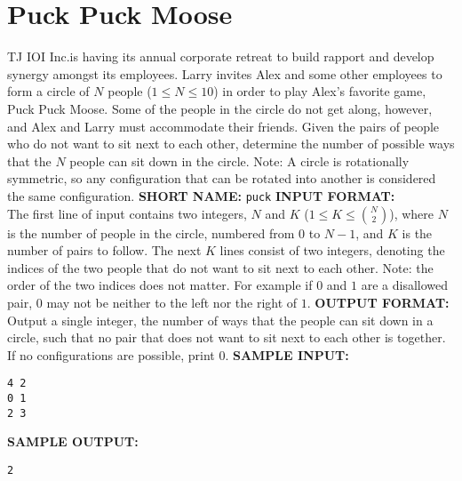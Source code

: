 \section{Puck Puck Moose}

TJ IOI Inc.\@ is having its annual corporate retreat to build rapport and develop synergy amongst its employees. Larry invites Alex and some other employees to form a circle of $ N $ people ($ 1 \leq N \leq 10 $) in order to play Alex's favorite game, Puck Puck Moose.  Some of the people in the circle do not get along, however, and Alex and Larry must accommodate their friends.  Given the pairs of people who do not want to sit next to each other, determine the number of possible ways that the $ N $ people can sit down in the circle.
\blank
Note: A circle is rotationally symmetric, so any configuration that can be rotated into another is considered the same configuration.
\blank
\textbf{SHORT NAME:} \verb|puck|
\blank
\textbf{INPUT FORMAT:}\\
The first line of input contains two integers, $ N $ and $ K $ ($ 1 \leq K \leq {{N}\choose{2}} $), where $ N $ is the number of people in the circle, numbered from $ 0 $ to $ N - 1 $, and $ K $ is the number of pairs to follow. The next $ K $ lines consist of two integers, denoting the indices of the two people that do not want to sit next to each other.
\blank
Note: the order of the two indices does not matter. For example if $ 0 $ and $ 1 $ are a disallowed pair, $ 0 $ may not be neither to the left nor the right of $ 1 $.
\blank
\textbf{OUTPUT FORMAT:}\\
Output a single integer, the number of ways that the people can sit down in a circle, such that no pair that does not want to sit next to each other is together.  If no configurations are possible, print $ 0 $.
\blank
\textbf{SAMPLE INPUT:}
\begin{verbatim}
4 2
0 1
2 3
\end{verbatim}
\textbf{SAMPLE OUTPUT:}
\begin{verbatim}
2
\end{verbatim}
